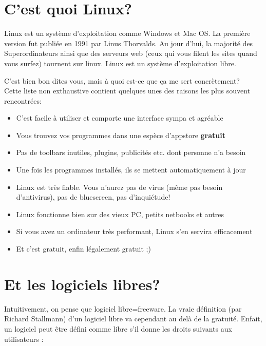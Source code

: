\documentclass[11pt]{../fiche}
\begin{document}


\section*{C'est quoi Linux?}

Linux est un système d'exploitation comme Windows et Mac OS. La première version fut publiée en 1991 par Linus Thorvalds.
Au jour d'hui, la majorité des Superordinateurs ainsi que des serveurs web (ceux qui vous filent les sites quand vous surfez)
tournent sur linux. Linux est un système d'exploitation libre.
\vspace{0.5cm}

C'est bien bon dites vous, mais à quoi est-ce que ça me sert concrètement?\\
Cette liste non exthaustive contient quelques unes des raisons les plus souvent rencontrées:
\begin{itemize}
\item C'est facile à utiliser et comporte une interface sympa et agréable
\item Vous trouvez vos programmes dans une espèce d'appstore \textbf{gratuit}
\item Pas de toolbars inutiles, plugins, publicités etc. dont personne n'a besoin
\item Une fois les programmes installés, ils se mettent automatiquement à jour
\item Linux est très fiable. Vous n'aurez pas de virus (même pas besoin d'antivirus),
pas de bluescreen, pas d'inquiétude!
\item Linux fonctionne bien sur des vieux PC, petits netbooks et autres
\item Si vous avez un ordinateur très performant, Linux s'en servira efficacement
\item Et c'est gratuit, enfin légalement gratuit ;)
\end{itemize}

\section*{Et les logiciels libres?}
Intuitivement, on pense que logiciel libre=freeware.
La vraie définition (par Richard Stallmann) d'un logiciel libre va cependant au delà de la gratuité.
Enfait, un logiciel peut être défini comme libre s'il donne les droits suivants aux utilisateurs :
\end{document}
